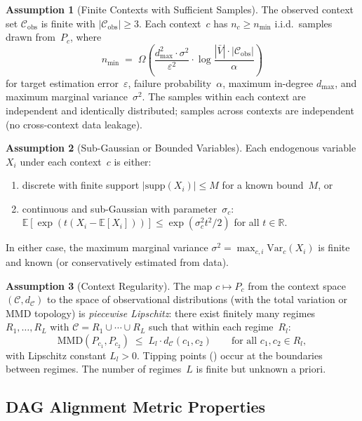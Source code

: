 \documentclass[11pt,a4paper]{article}
\theoremstyle{definition}
\newtheorem{assumption}{Assumption}
\newcommand{\cC}{\mathcal{C}}                 %
\newcommand{\Vbar}{\bar{V}}                   %
\newcommand{\MMD}{\mathrm{MMD}}               %
\newcommand{\dC}{d_{\cC}}                     %
\newcommand{\Cobs}{\cC_{\mathrm{obs}}}        %
\newcommand{\R}{\mathbb{R}}                   %
\newcommand{\eps}{\varepsilon}                %
\begin{document}
\begin{assumption}[Finite Contexts with Sufficient Samples]\label{ass:samples}
The observed context set $\Cobs$ is finite with $|\Cobs| \ge 3$.  Each
context~$c$ has $n_c \ge n_{\min}$ i.i.d.\ samples drawn from~$P_c$,
where
\[
  n_{\min}
  \;=\;
  \Omega\!\left(
    \frac{d_{\max}^2 \cdot \sigma^2}{\eps^2}
    \cdot \log\frac{|\Vbar| \cdot |\Cobs|}{\alpha}
  \right)
\]
for target estimation error~$\eps$, failure probability~$\alpha$,
maximum in-degree $d_{\max}$, and maximum marginal variance~$\sigma^2$.
The samples within each context are independent and identically
distributed; samples across contexts are independent (no cross-context
data leakage).
\end{assumption}

\begin{assumption}[Sub-Gaussian or Bounded Variables]\label{ass:subgaussian}
Each endogenous variable $X_i$ under each context~$c$ is either:
\begin{enumerate}[nosep,label=(\alph*)]
  \item discrete with finite support $|\mathrm{supp}(X_i)| \le M$ for a
        known bound~$M$, or
  \item continuous and sub-Gaussian with parameter~$\sigma_c$:
        $\mathbb{E}[\exp(t(X_i - \mathbb{E}[X_i]))] \le
        \exp(\sigma_c^2 t^2 / 2)$ for all $t \in \R$.
\end{enumerate}
In either case, the maximum marginal variance
$\sigma^2 = \max_{c,i} \mathrm{Var}_c(X_i)$ is finite and known (or
conservatively estimated from data).
\end{assumption}

\begin{assumption}[Context Regularity]\label{ass:regularity}
The map $c \mapsto P_c$ from the context space $(\cC, \dC)$ to the space
of observational distributions (with the total variation or MMD topology)
is \emph{piecewise Lipschitz}: there exist finitely many regimes
$R_1, \ldots, R_L$ with $\cC = R_1 \cup \cdots \cup R_L$ such that within
each regime~$R_l$:
\[
  \MMD(P_{c_1}, P_{c_2})
  \;\le\;
  L_l \cdot \dC(c_1, c_2)
  \qquad
  \text{for all } c_1, c_2 \in R_l,
\]
with Lipschitz constant $L_l > 0$.  Tipping points
() occur at the boundaries between regimes.  The
number of regimes~$L$ is finite but unknown a priori.
\end{assumption}

\subsection{DAG Alignment Metric Properties}\label{sec:thm-metric}
\end{document}
